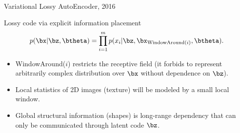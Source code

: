 \begin{frame}{Variational Lossy AutoEncoder, 2016}
	\begin{block}{Lossy code via explicit information placement}
	\[
	    p(\bx | \bz, \btheta) = \prod_{i=1}^m p(x_i | \bz, \bx_{\text{WindowAround}(i)}, \btheta).
	\]
	\begin{itemize}
	    \item WindowAround($i$) restricts the receptive field (it forbids to represent arbitrarily complex distribution over $\bx$ without dependence on $\bz$). 
	    \item Local statistics of 2D images (texture) will be modeled by a small local window.
	    \item Global structural information (shapes) is long-range dependency that can only be communicated through latent code $\bz$. 
	\end{itemize}
	\end{block}
\end{frame}
